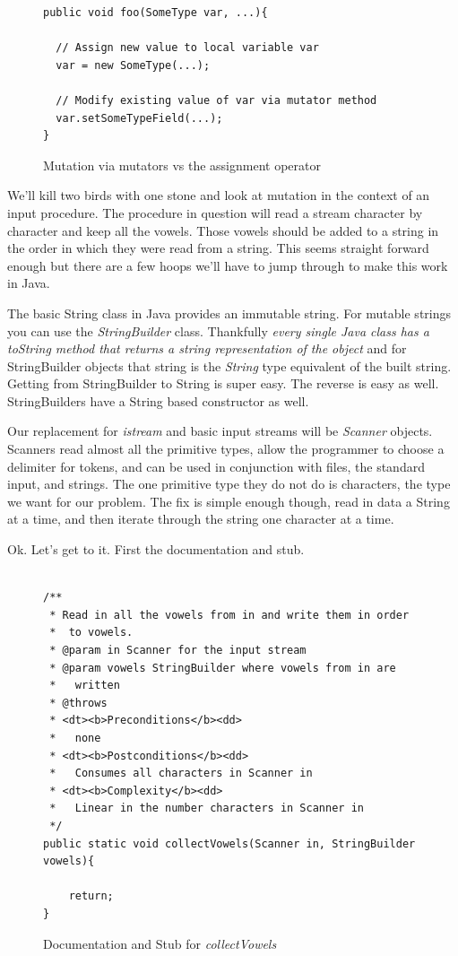 \documentclass[]{tufte-handout}
\begin{document}
\begin{figure}
\begin{lstlisting}
public void foo(SomeType var, ...){
  
  // Assign new value to local variable var
  var = new SomeType(...);
  
  // Modify existing value of var via mutator method
  var.setSomeTypeField(...);
}
\end{lstlisting}
\label{fig:mutatable}
\caption{Mutation via mutators vs the assignment operator}
\end{figure}

We'll kill two birds with one stone and look at mutation in the context of an input procedure. The procedure in question will read a stream character by character and keep all the vowels. Those vowels should be added to a string in the order in which they were read from a string. This seems straight forward enough but there are a few hoops we'll have to jump through to make this work in Java.

The basic String class in Java provides an immutable string. For mutable strings you can use the \textit{StringBuilder}  class. Thankfully \textit{every single Java class has a \textit{toString} method that returns a string representation of the object} and for StringBuilder objects that string is the \textit{String} type equivalent of the built string. Getting from StringBuilder to String is super easy. The reverse is easy as well. StringBuilders have a String based constructor as well. 

Our replacement for \textit{istream} and basic input streams will be \textit{Scanner} objects. Scanners read almost all the primitive types, allow the programmer to choose a delimiter for tokens, and can be used in conjunction with files, the standard input, and strings. The one primitive type they do not do is characters, the type we want for our problem. The fix is simple enough though, read in data a String at a time, and then iterate through the string one character at a time. 

Ok. Let's get to it. First the documentation and stub. 

\begin{figure}
\begin{lstlisting}

/**
 * Read in all the vowels from in and write them in order
 *  to vowels.
 * @param in Scanner for the input stream
 * @param vowels StringBuilder where vowels from in are
 *   written
 * @throws
 * <dt><b>Preconditions</b><dd>
 *   none
 * <dt><b>Postconditions</b><dd>
 *   Consumes all characters in Scanner in
 * <dt><b>Complexity</b><dd>
 *   Linear in the number characters in Scanner in
 */
public static void collectVowels(Scanner in, StringBuilder vowels){

	return;
}

\end{lstlisting}
\label{fig:vowelsdox}
\caption{Documentation and Stub for \textit{collectVowels}}
\end{figure}
\end{document}
